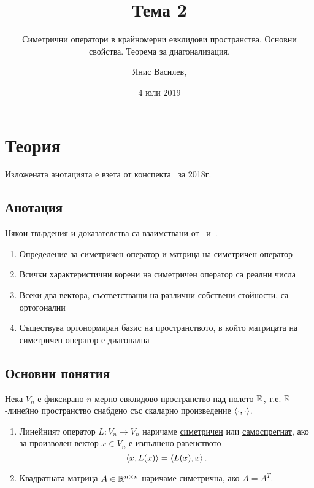 \documentclass[numbers=endperiod, DIV=15, bibliography=totocnumbered]{scrartcl}
\title{Тема 2}
\subtitle{Симетрични оператори в крайномерни евклидови пространства. Основни свойства. Теорема за диагонализация.}
\author{Янис Василев, \Email{ianis@ivasilev.net}}
\date{4 юли 2019}
\begin{document}
\maketitle

\section{Теория}

Изложената анотацията е взета от конспекта~\cite{Syllabus} за 2018г.

\subsection{Анотация}

Някои твърдения и доказателства са взаимствани от~\cite{Knapp} и~\cite{RoyachkiNotes}.

\begin{enumerate}
  \item Определение за симетричен оператор и матрица на симетричен оператор
  \item Всички характеристични корени на симетричен оператор са реални числа
  \item Всеки два вектора, съответстващи на различни собствени стойности, са ортогонални
  \item Съществува ортонормиран базис на пространството, в който матрицата на симетричен оператор е диагонална
\end{enumerate}

\subsection{Основни понятия}

Нека $V_n$ е фиксирано $n$-мерно евклидово пространство над полето $\mathbb{R}$, т.е. $\mathbb{R}$-линейно пространство снабдено със скаларно произведение $\left\langle \cdot, \cdot \right\rangle$.

\begin{definition}
  \mbox{}
  \begin{enumerate}
    \item Линейният оператор $L: V_n \to V_n$ наричаме \uline{симетричен} или \uline{самоспрегнат}, ако за произволен вектор $x \in V_n$ е изпълнено равенството
    \begin{displaymath}
      \left\langle x, L(x) \right\rangle = \left\langle L(x), x \right\rangle.
    \end{displaymath}

    \item Квадратната матрица $A \in \mathbb{R}^{n \times n}$ наричаме \uline{симетрична}, ако $A = A^T$.
  \end{enumerate}
\end{definition}
\end{document}
